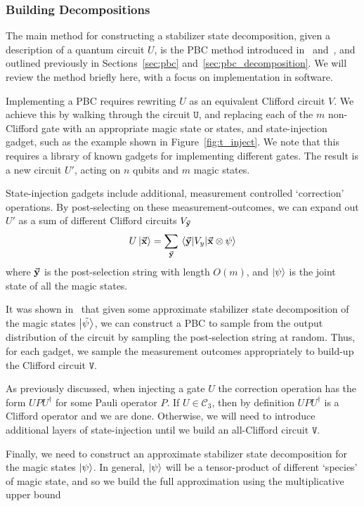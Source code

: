 \subsubsection{Building Decompositions}
The main method for constructing a stabilizer state decomposition, given a description of a quantum circuit $U$, is the PBC method introduced in~\cite{Bravyi2015} and~\cite{Bravyi2016}, and outlined previously in Sections~\ref{sec:pbc} and~\ref{sec:pbc_decomposition}. We will review the method briefly here, with a focus on implementation in software. \par
Implementing a PBC requires rewriting $U$ as an equivalent Clifford circuit $V$. We achieve this by walking through the circuit $\texttt{U}$, and replacing each of the $m$ non-Clifford gate with an appropriate magic state or states, and state-injection gadget, such as the example shown in Figure~\ref{fig:t_inject}. We note that this requires a library of known gadgets for implementing different gates. The result is a new circuit $U'$, acting on $n$ qubits and $m$ magic states.\par
State-injection gadgets include additional, measurement controlled `correction' operations. By post-selecting on these measurement-outcomes, we can expand out $U'$ as a sum of different Clifford circuits $V_{\va{y}}$
\[U\ket{\va{x}} = \sum_{\va{y}}\matrixel{\va{y}}{V_{y}}{\va{x}\otimes \psi} \]
where $\va{y}$ is the post-selection string with length $O(m)$, and $\ket{\psi}$ is the joint state of all the magic states.\par
It was shown in~\cite{Bravyi2016} that given some approximate stabilizer state decomposition of the magic states $\ket{\tilde{\psi}}$, we can construct a PBC to sample from the output distribution of the circuit by sampling the post-selection string at random. Thus, for each gadget, we sample the measurement outcomes appropriately to build-up the Clifford circuit $\mathtt{V}$.\par
As previously discussed, when injecting a gate $U$ the correction operation has the form $UPU^{\dagger}$ for some Pauli operator $P$. If $U\in\mathcal{C}_{3}$, then by definition $UPU^{\dagger}$ is a Clifford operator and we are done. Otherwise, we will need to introduce additional layers of state-injection until we build an all-Clifford circuit $\mathtt{V}$.\par
Finally, we need to construct an approximate stabilizer state decomposition for the magic states $\ket{\psi}$. In general, $\ket{\psi}$ will be a tensor-product of different `species' of magic state, and so we build the full approximation using the multiplicative upper bound

